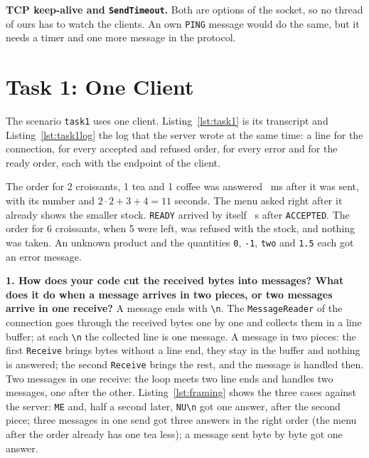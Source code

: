 \documentclass[12pt,a4paper]{article}
\begin{document}
\textbf{TCP keep-alive and \texttt{SendTimeout}.} Both are options of the socket, so no thread of ours has to watch the clients. An own \texttt{PING} message would do the same, but it needs a timer and one more message in the protocol.

\newpage
\section{Task 1: One Client}

The scenario \texttt{task1} uses one client. Listing~\ref{lst:task1} is its transcript and Listing~\ref{lst:task1log} the log that the server wrote at the same time: a line for the connection, for every accepted and refused order, for every error and for the ready order, each with the endpoint of the client.





The order for 2 croissants, 1 tea and 1 coffee was answered \oneAnswerMs~ms after it was sent, with its number and $2\cdot2+3+4=11$ seconds. The menu asked right after it already shows the smaller stock. \texttt{READY} arrived by itself \oneReadySeconds~s after \texttt{ACCEPTED}. The order for 6 croissants, when 5 were left, was refused with the stock, and nothing was taken. An unknown product and the quantities \texttt{0}, \texttt{-1}, \texttt{two} and \texttt{1.5} each got an error message.

\textbf{1. How does your code cut the received bytes into messages? What does it do when a message arrives in two pieces, or two messages arrive in one receive?} A message ends with \texttt{\textbackslash n}. The \texttt{MessageReader} of the connection goes through the received bytes one by one and collects them in a line buffer; at each \texttt{\textbackslash n} the collected line is one message. A message in two pieces: the first \texttt{Receive} brings bytes without a line end, they stay in the buffer and nothing is answered; the second \texttt{Receive} brings the rest, and the message is handled then. Two messages in one receive: the loop meets two line ends and handles two messages, one after the other. Listing~\ref{lst:framing} shows the three cases against the server: \texttt{ME} and, half a second later, \texttt{NU\textbackslash n} got one answer, after the second piece; three messages in one send got three answers in the right order (the menu after the order already has one tea less); a message sent byte by byte got one answer.
\end{document}
